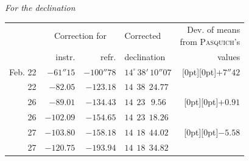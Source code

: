 \begin{center}\footnotesize\setlength{\tabcolsep}{4pt}
\emph{For the declination}
\end{center}

\begin{center}\footnotesize\setlength{\tabcolsep}{4pt}
\begin{tabular}{r|r|r|l|r}
 & \multicolumn{2}{c|}{Correction for} & Corrected & \shortstack{Dev. of means\\from \textsc{Pasquich}'s}\\
 & instr. & refr. & declination & values \\
\hline
Feb. 22 & $-61''15$ & $-100''78$ & $14^\circ\,38'\,10''07$ & \raisebox{-5.5pt}[0pt][0pt]{$+7''42$} \\
22 & $-82.05$ & $-123.18$ & $14\ \ 38\ \ 24.77$ & \\
26 & $-89.01$ & $-134.43$ & $14\ \ 23\ \ \ 9.56$ & \raisebox{-5.5pt}[0pt][0pt]{$+0.91$} \\
26 & $-102.09$ & $-154.65$ & $14\ \ 23\ \ 18.26$ & \\
27 & $-103.80$ & $-158.18$ & $14\ \ 18\ \ 44.02$ & \raisebox{-5.5pt}[0pt][0pt]{$-5.58$} \\
27 & $-120.75$ & $-193.94$ & $14\ \ 18\ \ 34.82$ & \\
\end{tabular}
\end{center}

